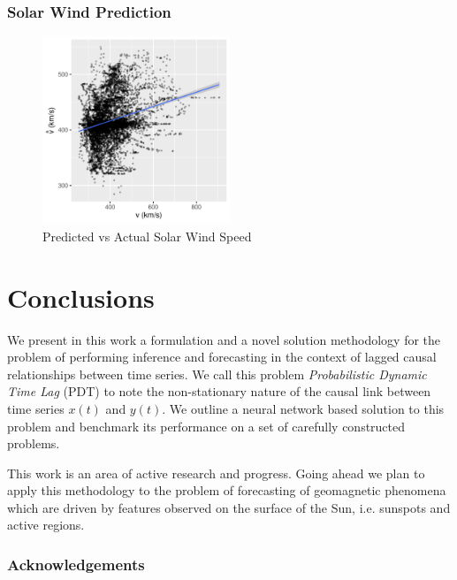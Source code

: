 \documentclass[envcountsect,runningheads]{llncs}
\theoremstyle{etoile}
\begin{document}
\subsubsection{Solar Wind Prediction}

\begin{figure}
  \centering
  \includegraphics[width=0.5\textwidth]{figures/test_scatter_v}
  \caption{Predicted vs Actual Solar Wind Speed} 
  \label{fig:sw_preds}
\end{figure}


\section{Conclusions}

We present in this work a formulation and a novel solution methodology for the problem of performing 
inference and forecasting in the context of lagged causal relationships between time series. 
We call this problem \emph{Probabilistic Dynamic Time Lag} (PDT) to note the non-stationary nature of the 
causal link between time series $x(t)$ and $y(t)$. We outline a neural network based solution to this 
problem and benchmark its performance on a set of carefully constructed problems.

This work is an area of active research and progress. Going ahead we plan to apply this methodology 
to the problem of forecasting of geomagnetic phenomena which are driven by features observed on the 
surface of the Sun, i.e. sunspots and active regions.


\subsubsection*{Acknowledgements}

\begin{appendix}
%
%


\end{appendix}


\clearpage

\end{document}
